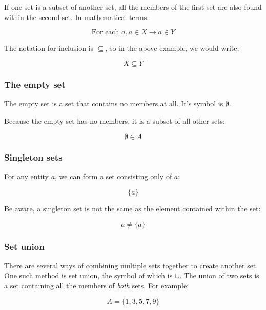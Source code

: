 \documentclass{article}
\begin{document}
If one set is a subset of another set, all the members of the first set are also found within the second set. In mathematical terms:

\[
	\textrm{For each }a, a \in X \rightarrow a \in Y
\]

The notation for inclusion is $\subseteq$, so in the above example, we would
write:


\[
	X \subseteq Y
\]

\subsubsection{The empty set}
\label{subsubsec:empty_set}

The empty set is a set that contains no members at all. It's symbol is
$\emptyset$.

Because the empty set has no members, it is a subset of all other sets:


\[
	\emptyset \in A
\]

\subsubsection{Singleton sets}

For any entity $a$, we can form a set consisting only of $a$:

\[
	\{a\}
\]

Be aware, a singleton set is not the same as the element contained within the set:

\[
	a \neq \{a\}
\]

\subsubsection{Set union}

There are several ways of combining multiple sets together to create another
set. One such method is set union, the symbol of which is $\cup$. The union of
two sets is a set containing all the members of {\it both} sets. For example:

\[
	A = \{1, 3, 5, 7, 9\}
\]
\end{document}
